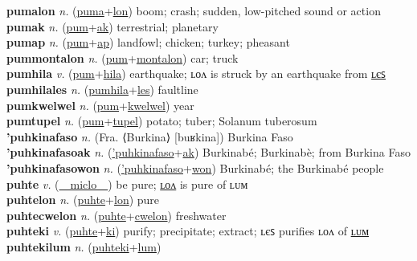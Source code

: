 \textbf{pumalon} \textit{n.} (\hyperref[puma]{puma}+\hyperref[lon]{lon})
boom; crash; sudden, low-pitched sound or action \label{pumalon} \\
\textbf{pumak} \textit{n.} (\hyperref[pum]{pum}+\hyperref[ak]{ak})
terrestrial; planetary \label{pumak} \\
\textbf{pumap} \textit{n.} (\hyperref[pum]{pum}+\hyperref[ap]{ap})
landfowl; chicken; turkey; pheasant \label{pumap} \\
\textbf{pummontalon} \textit{n.} (\hyperref[pum]{pum}+\hyperref[montalon]{montalon})
car; truck \label{pummontalon} \\
\textbf{pumhila} \textit{v.} (\hyperref[pum]{pum}+\hyperref[hila]{hila})
earthquake; ʟᴏᴧ is struck by an earthquake from \hyperref[pumhilales]{ʟєꜱ} \label{pumhila} \\
\textbf{pumhilales} \textit{n.} (\hyperref[pumhila]{pumhila}+\hyperref[les]{les})
faultline \label{pumhilales} \\
\textbf{pumkwelwel} \textit{n.} (\hyperref[pum]{pum}+\hyperref[kwelwel]{kwelwel})
year \label{pumkwelwel} \\
\textbf{pumtupel} \textit{n.} (\hyperref[pum]{pum}+\hyperref[tupel]{tupel})
potato; tuber; Solanum tuberosum \label{pumtupel} \\
\textbf{'puhkinafaso} \textit{n.} (Fra. ⟨Burkina⟩ [buʁkina])
Burkina Faso \label{'puhkinafaso} \\
\textbf{'puhkinafasoak} \textit{n.} (\hyperref['puhkinafaso]{'puhkinafaso}+\hyperref[ak]{ak})
Burkinabé; Burkinabè; from Burkina Faso \label{'puhkinafasoak} \\
\textbf{'puhkinafasowon} \textit{n.} (\hyperref['puhkinafaso]{'puhkinafaso}+\hyperref[won]{won})
Burkinabé; the Burkinabé people \label{'puhkinafasowon} \\
\textbf{puhte} \textit{v.} (\hyperref[miclo]{~~miclo~~})
be pure; \hyperref[puhtelon]{ʟᴏᴧ} is pure of ʟᴜᴍ \label{puhte} \\
\textbf{puhtelon} \textit{n.} (\hyperref[puhte]{puhte}+\hyperref[lon]{lon})
pure \label{puhtelon} \\
\textbf{puhtecwelon} \textit{n.} (\hyperref[puhte]{puhte}+\hyperref[cwelon]{cwelon})
freshwater \label{puhtecwelon} \\
\textbf{puhteki} \textit{v.} (\hyperref[puhte]{puhte}+\hyperref[ki]{ki})
purify; precipitate; extract; ʟєꜱ purifies ʟᴏᴧ of \hyperref[puhtekilum]{ʟᴜᴍ} \label{puhteki} \\
\textbf{puhtekilum} \textit{n.} (\hyperref[puhteki]{puhteki}+\hyperref[lum]{lum})
